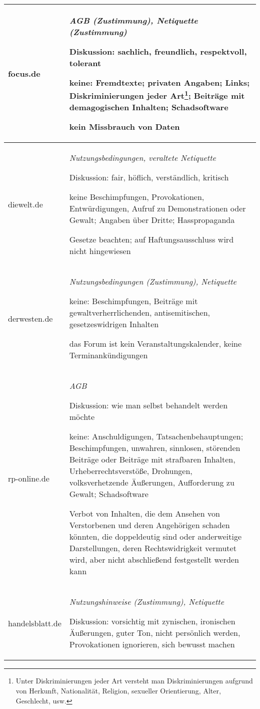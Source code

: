 \begin{landscape}
\begin{longtable}{lp{170mm}}
focus.de & \emph{AGB (Zustimmung), Netiquette (Zustimmung)}
	
	Diskussion: sachlich, freundlich, respektvoll, tolerant
	
	keine: Fremdtexte; privaten Angaben; Links; Diskriminierungen jeder Art\footnote{Unter Diskriminierungen jeder Art versteht man Diskriminierungen  
	aufgrund von Herkunft, Nationalität, Religion, sexueller Orientierung, Alter,
	Geschlecht, usw.}; Beiträge mit  demagogischen Inhalten; Schadsoftware
	
	kein Missbrauch von Daten
	\tabularnewline\midrule

diewelt.de & \emph{Nutzungsbedingungen, veraltete Netiquette}

	Diskussion: fair, höflich, verständlich, kritisch
		
	keine Be\-schim\-pfung\-en, Pro\-vo\-ka\-tio\-nen, Ent\-wür\-di\-gung\-en, Auf\-ruf zu Demonstrationen oder Gewalt; Angaben über Dritte; 					Hasspropaganda 
	
	Gesetze beachten; auf Haftungsausschluss wird nicht hingewiesen\tabularnewline\midrule

derwesten.de & \emph{Nutzungsbedingungen (Zustimmung), Netiquette}

	keine: Beschimpfungen, Beiträge mit gewaltverherrlichenden, antisemitischen, gesetzeswidrigen Inhalten

	das Forum ist kein Ver\-an\-stal\-tungs\-ka\-len\-der, keine Ter\-min\-an\-kün\-di\-gun\-gen
	\tabularnewline\midrule


rp-online.de & \emph{AGB}

	Diskussion: wie man selbst behandelt werden möchte
	
	keine: Anschuldigungen, Tatsachenbehauptungen; Beschimpfungen, unwahren, sinnlosen, störenden Beiträge oder Beiträge mit strafbaren Inhalten, Urheberrechtsverstöße, Drohungen, volksverhetzende Äußerungen, Aufforderung zu Gewalt; Schadsoftware
	
	Verbot von Inhalten, die dem Ansehen von Verstorbenen und deren Angehörigen schaden könnten, die doppeldeutig
	sind oder anderweitige Darstellungen, deren Rechtswidrigkeit vermutet
	wird, aber nicht abschließend festgestellt werden kann
	\tabularnewline\midrule

handelsblatt.de & \emph{Nutzungshinweise (Zustimmung), Netiquette}

	Diskussion: vorsichtig mit zynischen, ironischen Äußerungen, guter Ton, nicht
	persönlich werden, Provokationen ignorieren, sich bewusst machen
	 

\end{longtable}
\end{landscape}

